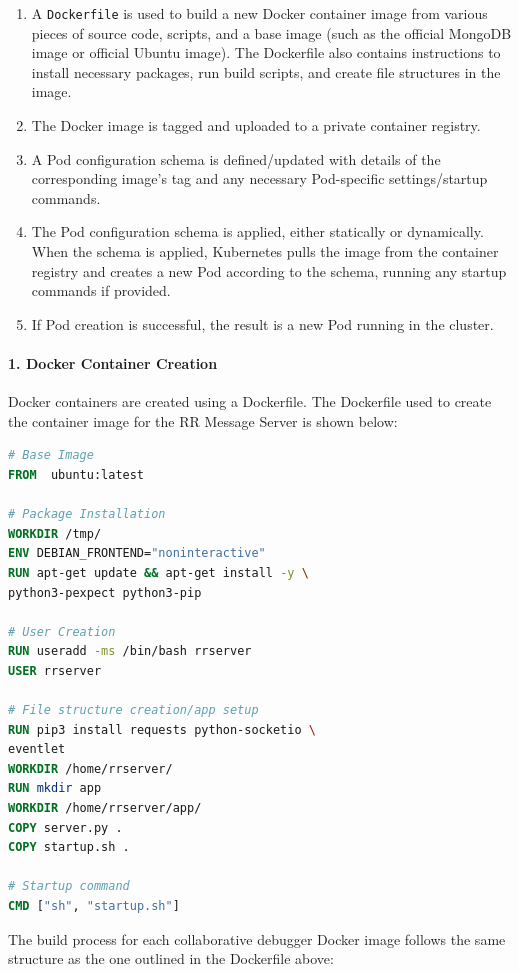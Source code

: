 \documentclass[12pt]{article}
\begin{document}
\begin{enumerate}
\item A \lstinline{Dockerfile} is used to build a new Docker container
  image from various pieces of source code, scripts, and a base image
  (such as the official MongoDB image or official Ubuntu image).  The
  Dockerfile also contains instructions to install necessary packages,
  run build scripts, and create file structures in the image.
\item The Docker image is tagged and uploaded to a private container
  registry.
\item A Pod configuration schema is defined/updated with details of
  the corresponding image's tag and any necessary Pod-specific
  settings/startup commands.
\item The Pod configuration schema is applied, either statically or
  dynamically.  When the schema is applied, Kubernetes pulls the image
  from the container registry and creates a new Pod according to the
  schema, running any startup commands if provided.
\item If Pod creation is successful, the result is a new Pod running
  in the cluster.
\end{enumerate}

\paragraph{1. Docker Container Creation}

Docker containers are created using a Dockerfile.  The Dockerfile used
to create the container image for the RR Message
Server is shown below:

\begin{lstlisting}[language=Dockerfile,caption={RR Message Server Dockerfile},captionpos=b]
# Base Image
FROM  ubuntu:latest

# Package Installation
WORKDIR /tmp/
ENV DEBIAN_FRONTEND="noninteractive"
RUN apt-get update && apt-get install -y \
python3-pexpect python3-pip

# User Creation
RUN useradd -ms /bin/bash rrserver
USER rrserver

# File structure creation/app setup
RUN pip3 install requests python-socketio \
eventlet
WORKDIR /home/rrserver/
RUN mkdir app
WORKDIR /home/rrserver/app/
COPY server.py .
COPY startup.sh .

# Startup command
CMD ["sh", "startup.sh"]
\end{lstlisting}

The build process for each collaborative debugger Docker image follows
the same structure as the one outlined in the Dockerfile above:
\end{document}
